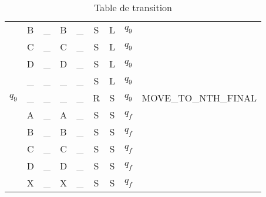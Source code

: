 \documentclass{report}
\begin{document}
\begin{appendix}
\begin{table}
\begin{tabular}{| c | c c | c c | c c | c | c |}
             & B & \_ & B & \_ & S & L & $q_9$ & \\
             & C & \_ & C & \_ & S & L & $q_9$ & \\
             & D & \_ & D & \_ & S & L & $q_9$ & \\
             & \_ & \_ & \_ & \_ & S & L & $q_9$ & \\
        \hline
        $q_9$ & \_ & \_ & \_ & \_ & R & S & $q_9$ & MOVE\_TO\_NTH\_FINAL \\
             & A & \_ & A & \_ & S & S & $q_f$ & \\
             & B & \_ & B & \_ & S & S & $q_f$ & \\
             & C & \_ & C & \_ & S & S & $q_f$ & \\
             & D & \_ & D & \_ & S & S & $q_f$ & \\
             & X & \_ & X & \_ & S & S & $q_f$ & \\
        \hline
      \end{tabular}
      \caption{Table de transition}
    \end{table}
\end{appendix}
\end{document}
